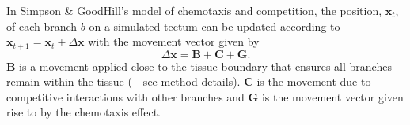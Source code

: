 \documentclass[9pt,lineno,draft]{elife}
\begin{document}
In Simpson \& GoodHill's model of chemotaxis and competition, the position, $\mathbf{x}_t$, of each branch $b$ on a simulated tectum can be updated according to $\mathbf{x}_{t+1} = \mathbf{x}_{t} + \Delta \mathbf{x}$ with the movement vector given by
\begin{equation} \label{e:dX}
 \Delta \mathbf{x} = \mathbf{B} + \mathbf{C} + \mathbf{G}.
\end{equation}
$\mathbf{B}$ is a movement applied close to the tissue boundary that ensures all branches remain within the tissue (\citet{holt_target_1998}---see method details).
%
%
$\mathbf{C}$ is the movement due to competitive interactions with other branches
%
and $\mathbf{G}$ is the movement vector given rise to by the chemotaxis effect.


%




\end{document}

